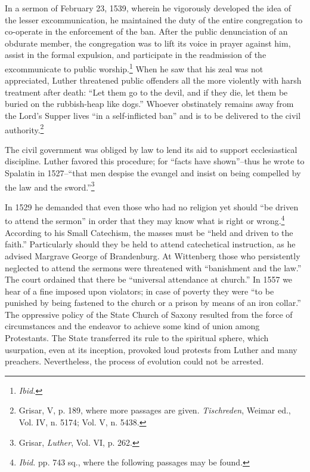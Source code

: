 In a sermon of February 23, 1539, wherein he vigorously developed
the idea of the lesser excommunication, he maintained the duty of
the entire congregation to co-operate in the enforcement of the ban.
After the public denunciation of an obdurate member, the congregation
was to lift its voice in prayer against him, assist in the formal
expulsion, and participate in the readmission of the excommunicate
to public worship.\footnote{\textit{Ibid.}}
When he saw that his zeal was not appreciated,
Luther threatened public offenders all the more violently with harsh
treatment after death: “Let them go to the devil, and if they die,
let them be buried on the rubbish-heap like dogs.” Whoever obstinately
remains away from the Lord’s Supper lives “in a self-inflicted
ban” and is to be delivered to the civil authority.\footnote
{Grisar, V, p. 189, where more passages are given. \textit{Tischreden}, Weimar ed., Vol. IV,
n. 5174; Vol. V, n. 5438.}

The civil government was obliged by law to lend its aid to support
ecclesiastical discipline. Luther favored this procedure; for “facts have
shown”--thus he wrote to Spalatin in 1527--“that men despise the
evangel and insist on being compelled by the law and the sword.”\footnote{Grisar, \textit{Luther}, Vol. VI, p. 262.}

In 1529 he demanded that even those who had no religion yet should
“be driven to attend the sermon” in order that they may know what
is right or wrong.\footnote{\textit{Ibid.} pp. 743 sq., where the following passages may be found.}
 According to his Small Catechism, the masses
must be “held and driven to the faith.” Particularly should they be
held to attend catechetical instruction, as he advised Margrave George
of Brandenburg. At Wittenberg those who persistently neglected to
attend the sermons were threatened with “banishment and the law.”
The court ordained that there be “universal attendance at church.”
In 1557 we hear of a fine imposed upon violators; in case of poverty
they were “to be punished by being fastened to the church or a
prison by means of an iron collar.” The oppressive policy of the State
Church of Saxony resulted from the force of circumstances and the
endeavor to achieve some kind of union among Protestants. The
State transferred its rule to the spiritual sphere, which usurpation,
even at its inception, provoked loud protests from Luther and many
preachers. Nevertheless, the process of evolution could not be arrested.

